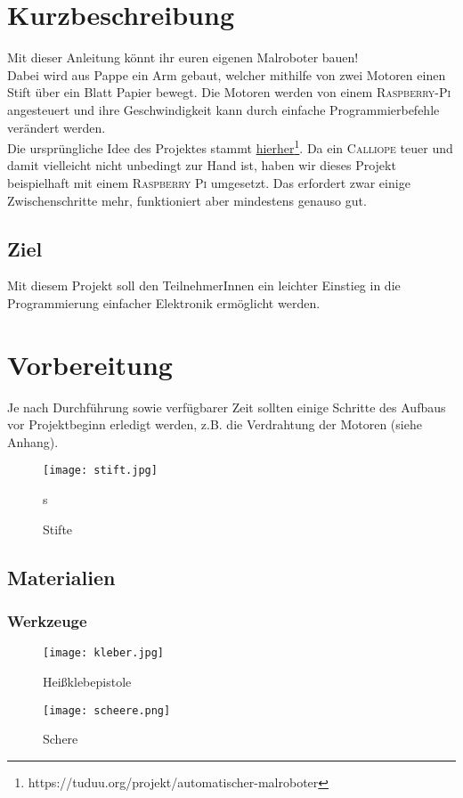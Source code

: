 \section{Kurzbeschreibung}
Mit dieser Anleitung könnt ihr euren eigenen Malroboter bauen!\\
Dabei wird aus Pappe ein Arm gebaut, welcher mithilfe von zwei Motoren einen Stift über ein Blatt Papier bewegt. Die Motoren werden von einem \textsc{Raspberry-Pi} angesteuert und ihre Geschwindigkeit kann durch einfache Programmierbefehle verändert werden.\\

Die ursprüngliche Idee des Projektes stammt \href{https://tuduu.org/projekt/automatischer-malroboter}{hierher}\footnote[1]{https://tuduu.org/projekt/automatischer-malroboter}. Da ein \textsc{Calliope} teuer und damit vielleicht nicht unbedingt zur Hand ist, haben wir dieses Projekt beispielhaft mit einem \textsc{Raspberry Pi} umgesetzt. Das erfordert zwar einige Zwischenschritte mehr, funktioniert aber mindestens genauso gut.\\

\subsection{Ziel}
Mit diesem Projekt soll den TeilnehmerInnen ein leichter Einstieg in die Programmierung einfacher Elektronik ermöglicht werden.\\



\section{Vorbereitung}
Je nach Durchführung sowie verfügbarer Zeit sollten einige Schritte des Aufbaus vor Projektbeginn erledigt werden, z.B. die Verdrahtung der Motoren (siehe Anhang).\\

\begin{figure}[H]
\centering
\parbox{5cm}{
\texttt{[image: stift.jpg]}
\caption*{Stifte}s
}
\hfill
\begin{minipage}{5cm}
\end{minipage}
\end{figure}

\subsection{Materialien}

\subsubsection{Werkzeuge}
\begin{figure}[H]
\centering
\parbox{5cm}{
\texttt{[image: kleber.jpg]}
\caption*{Heißklebepistole}
}
\qquad
\begin{minipage}{5cm}
\texttt{[image: scheere.png]}
\caption*{Schere}
\end{minipage}
\end{figure}


